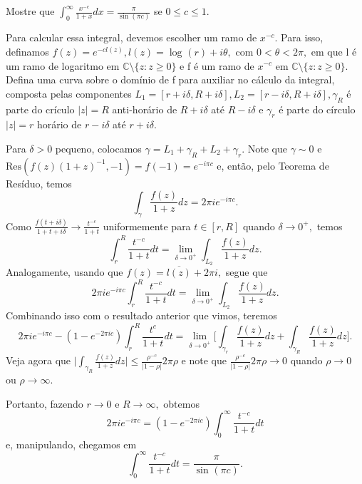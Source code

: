 \documentclass[ComplexAnalysis/complex.tex]{subfiles}
\begin{document}
\begin{exer*}
	Mostre que \(\int_{0}^{\infty}\frac{x^{-c}}{1+x}dx = \frac{\pi }{\sin^{}{(\pi c)}}\) se \(0 \leq c\leq 1.\)

	Para calcular essa integral, devemos escolher um ramo de \(x^{-c}.\) Para isso, definamos \(f(z) = e^{-c l(z)}, l(z) = \log^{}{(r)} + i\theta ,\) com
	\(0 < \theta <2\pi ,\) em que l é um ramo de logaritmo em \(\mathbb{C}\setminus{\{z: z\geq 0\}}\) e f é um ramo de \(x^{-c}\) em \(\mathbb{C}\setminus{\{z: z \geq 0\}}.\)
	Defina uma curva sobre o domínio de f para auxiliar no cálculo da integral, composta pelas componentes \(L_{1} = [r+i\delta , R+i\delta ], L_{2} = [r-i\delta , R+i\delta ],\gamma_{R}\)
	é parte do crículo \(|z| = R\) anti-horário de \(R+i\delta \) até \(R-i\delta \) e \(\gamma_{r}\) é parte do círculo \(|z| = r\) horário de \(r-i\delta \) até \(r+i\delta \).

	Para \(\delta > 0\) pequeno, colocamos \(\gamma  = L_{1} + \gamma _{R} + L_{2} + \gamma_{r}\). Note que \(\gamma \sim 0\) e \(\mathrm{Res}(f(z)(1+z)^{-1}, -1) = f(-1) = e^{-i\pi c}\) e, então, pelo Teorema de
	Resíduo, temos
	\[
		\int_{\gamma }^{}\frac{f(z)}{1+z}dz = 2\pi i e^{-i\pi c}.
	\]
	Como \(\frac{f(t+i\delta )}{1+t+i\delta }\to \frac{t^{-c}}{1+t}\) uniformemente para \(t\in[r, R]\) quando \(\delta \to 0^{+},\) temos
	\[
		\int_{r}^{R}\frac{t^{-c}}{1+t}dt = \lim_{\delta \to 0^{+}}\int_{L_{2}}^{}\frac{f(z)}{1+z}dz.
	\]
	Analogamente, usando que \(f(z) = \overline{l(z)}+2\pi i,\) segue que
	\[
		2\pi ie^{-i\pi c}\int_{r}^{R}\frac{t^{-c}}{1+t}dt = \lim_{\delta \to 0^{+}} \int_{L_{2}}^{}\frac{f(z)}{1+z}dz.
	\]
	Combinando isso com o resultado anterior que vimos, teremos
	\[
		2\pi i e^{-i\pi c} - (1 - e^{-2\pi ic})\int_{r}^{R}\frac{t^{c}}{1+t}dt = \lim_{\delta \to 0^{+}}\biggl[\int_{\gamma_{r}}^{}\frac{f(z)}{1+z}dz + \int_{\gamma_R}^{}\frac{f(z)}{1+z}dz\biggr].
	\]
	Veja agora que \(\biggl\vert \int_{\gamma_{R}}^{}\frac{f(z)}{1+z}dz \biggr\vert \leq \frac{\rho ^{-c}}{|1-\rho |}2\pi \rho \) e note que \(\frac{\rho^{-c} }{|1-\rho |}2\pi \rho \to 0\) quando \(\rho \to 0\) ou \(\rho \to \infty.\)

	Portanto, fazendo \(r\to0\) e \(R\to\infty,\) obtemos
	\[
		2\pi i e^{-i\pi c} = (1-e^{-2\pi ic})\int_{0}^{\infty}\frac{t^{-c}}{1+t}dt
	\]
	e, manipulando, chegamos em
	\[
		\int_{0}^{\infty}\frac{t^{-c}}{1+t}dt = \frac{\pi }{\sin^{}{(\pi c)}}.
	\]
\end{exer*}
\end{document}
